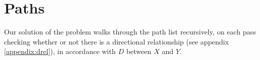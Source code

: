 %
%

\section{Paths}
Our solution of the  problem walks through the path list
recursively, on each pass checking whether or not there is a directional
relationship (see appendix \ref{appendix:drel}), in accordance with $D$
between $X$ and $Y$.

